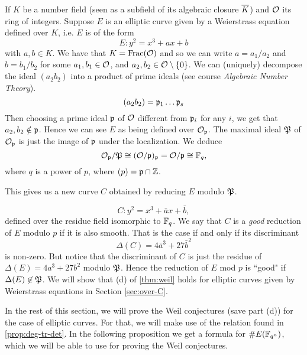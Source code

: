 If $K$ be a number field (seen as a subfield of its algebraic closure $\overline{K}$)
and $\mathcal{O}$ its ring of integers. Suppose $E$ is an elliptic curve given by a
Weierstrass equation defined over $K$, i.e. $E$ is of the form
\begin{equation*}
	E: y^2 = x^3 + ax + b
\end{equation*}
with $a, b \in K$. We have that $K = \operatorname{Frac}(\mathcal{O})$ and so we can write
$a = a_1/a_2$ and $b = b_1/b_2$ for some $a_1, b_1 \in \mathcal{O}$, and
$a_2, b_2 \in \mathcal{O}\setminus\{0\}$.
We can (uniquely) decompose the ideal $(a_2b_2)$ into a product of prime ideals
(see course \emph{Algebraic Number Theory}).
\begin{equation*}
	(a_2b_2) = \mathfrak{p}_1\dots\mathfrak{p}_s
\end{equation*}
Then choosing a prime ideal
$\mathfrak{p}$ of $\mathcal{O}$ different from $\mathfrak{p}_i$ for any $i$,
we get that $a_2, b_2 \notin \mathfrak{p}$.
Hence we can see $E$ as being defined over $\mathcal{O}_\mathfrak{p}$.
The maximal ideal $\mathfrak{P}$ of $\mathcal{O}_\mathfrak{p}$ is just the image of $\mathfrak{p}$
under the localization. We deduce
\begin{equation*}
	\mathcal{O}_\mathfrak{p}/\mathfrak{P} \cong (\mathcal{O}/\mathfrak{p})_\mathfrak{p} = \mathcal{O}/\mathfrak{p} \cong \mathbb{F}_q,
\end{equation*}
where $q$ is a power of $p$, where $(p) = \mathfrak{p}\cap\mathbb{Z}$.

This gives us a new curve $C$ obtained by reducing $E$ modulo $\mathfrak{P}$.

\begin{equation*}
	C: y^2 = x^3 + \bar{a}x + \bar{b},
\end{equation*}
defined over the residue field isomorphic to $\mathbb{F}_q$.
We say that $C$ is a \emph{good} reduction of $E$ modulo $p$
if it is also smooth. That is the case if and only if its discriminant
\begin{equation*}
	\Delta(C) = 4\bar{a}^3 + 27\bar{b}^2
\end{equation*}
is non-zero. But notice that the discriminant of $C$ is just the residue
of $\Delta(E) = 4a^3 + 27b^2$ modulo $\mathfrak{P}$.
Hence the reduction of $E$ mod $p$ is ``good" if $\Delta(E) \not\in \mathfrak{P}$.
We will show that (d) of \ref{thm:weil} holds for elliptic curves given
by Weierstrass equations in Section
\ref{sec:over-C}.

In the rest of this section, we will prove the Weil conjectures (save part (d))
for the case
of elliptic curves. For that, we will make use of the relation found in
\ref{prop:deg-tr-det}.
In the following proposition we get a formula for $\#E(\mathbb{F}_{q^n})$, which
we will be able to use for proving the Weil conjectures.

